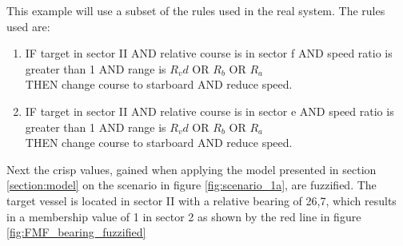 This example will use a subset of the rules used in the real system.
The rules used are:
\begin{enumerate}[label=\textbf{Rule \arabic*},ref=Rule \arabic*]
    \item \label{rule:1} IF target in sector II AND relative course is in sector f  AND speed ratio is greater than 1  AND range is $R_vd$ OR $R_b$ OR $R_a$ \\THEN change course to starboard  AND  reduce speed.
    \item IF target in sector II AND relative course is in sector e AND  speed ratio is greater than 1  AND  range is $R_vd$ OR $R_b$ OR $R_a$ \\THEN change course to starboard  AND  reduce speed.
\end{enumerate}

Next the crisp values, gained when applying the model presented in section \ref{section:model} on the scenario in figure \ref{fig:scenario_1a}, are fuzzified. The target vessel is located in sector II with a relative bearing of 26,7\textdegree, which results in a membership value of 1 in sector 2 as shown by the red line in figure \ref{fig:FMF_bearing_fuzzified}

